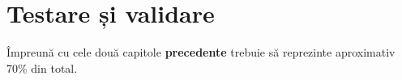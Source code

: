 \chapter{Testare și validare}
\pagestyle{fancy}

{\color{blue}Împreună cu cele două capitole \textbf{precedente}  trebuie să reprezinte aproximativ 70\% din total.\\}

